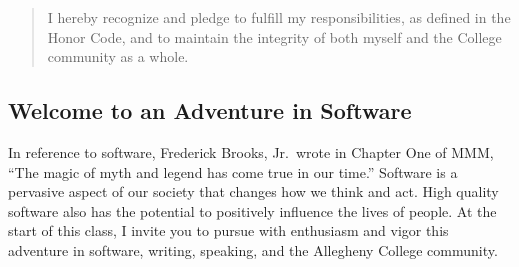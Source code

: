 \begin{quote}
I hereby recognize and pledge to fulfill my responsibilities, as defined in the Honor Code, and to maintain the
integrity of both myself and the College community as a whole.  
\end{quote}

\subsection*{Welcome to an Adventure in Software}

In reference to software, Frederick Brooks, Jr.\ wrote in Chapter One of MMM, ``The magic of myth and legend has come
true in our time.'' Software is a pervasive aspect of our society that changes how we think and act.  High quality
software also has the potential to positively influence the lives of people. At the start of this class, I invite you to
pursue with enthusiasm and vigor this adventure in software, writing, speaking, and the Allegheny College community.


